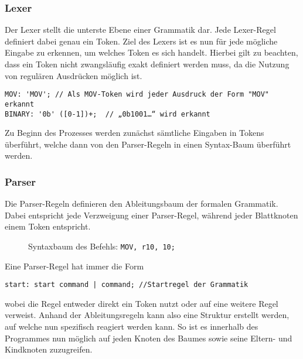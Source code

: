 \documentclass[paper=a4,fontsize=12pt]{scrreprt}
\begin{document}
\subsubsection{Lexer}
Der Lexer stellt die unterste Ebene einer Grammatik dar. Jede Lexer-Regel definiert dabei genau ein Token. Ziel des Lexers ist es nun für jede mögliche Eingabe zu erkennen, um welches Token es sich handelt. Hierbei gilt zu beachten, dass ein Token nicht zwangsläufig exakt definiert werden muss, da die Nutzung von regulären Ausdrücken möglich ist.
\begin{lstlisting}
MOV: 'MOV'; // Als MOV-Token wird jeder Ausdruck der Form "MOV" erkannt
BINARY: '0b' ([0-1])+;  // „0b1001…“ wird erkannt
\end{lstlisting}
Zu Beginn des Prozesses werden zunächst sämtliche Eingaben in Tokens überführt, welche dann von den Parser-Regeln in einen Syntax-Baum überführt werden.

\subsubsection{Parser}
Die Parser-Regeln definieren den Ableitungsbaum der formalen Grammatik. Dabei entspricht jede Verzweigung einer Parser-Regel, während jeder Blattknoten einem Token entspricht.

\begin{figure}[h]
\centering
\caption{Syntaxbaum des Befehls: \texttt{MOV, r10, 10;}}
\end{figure}

Eine Parser-Regel hat immer die Form
\begin{lstlisting}
start: start command | command; //Startregel der Grammatik
\end{lstlisting}
wobei die Regel entweder direkt ein Token nutzt oder auf eine weitere Regel verweist.
Anhand der Ableitungsregeln kann also eine Struktur erstellt werden, auf welche nun spezifisch reagiert werden kann. So ist es innerhalb des Programmes nun möglich auf jeden Knoten des Baumes sowie seine Eltern- und Kindknoten zuzugreifen.
\end{document}
